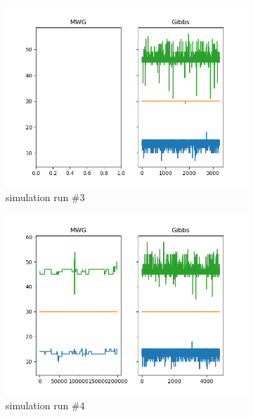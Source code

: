 \begin{figure}[H]
\begin{subfigure}{.3\textwidth}
    	\includegraphics[width=\linewidth]{../../plots/Trace_post_burnin_M4_N60_NMCMC3_seed2_diffind2.png}
    	\caption{simulation run \#3}
	\end{subfigure}
	\begin{subfigure}{.3\textwidth}
	    \centering
    	\includegraphics[width=\linewidth]{../../plots/Trace_post_burnin_M4_N60_NMCMC3_seed3_diffind2.png}
    	\caption{simulation run \#4}
	\end{subfigure}
	\begin{subfigure}{.3\textwidth}
	    \centering

\end{subfigure}
\end{figure}

